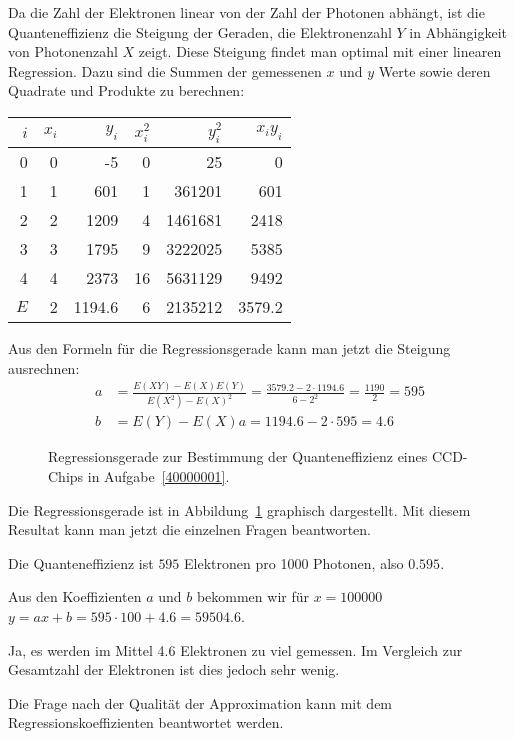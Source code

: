 \begin{loesung}
Da die Zahl der Elektronen linear von der Zahl der Photonen abhängt,
ist die Quanteneffizienz die Steigung der Geraden, die Elektronenzahl $Y$
in Abhängigkeit von Photonenzahl $X$ zeigt. Diese Steigung findet man
optimal mit einer linearen Regression. Dazu sind die Summen der gemessenen
$x$ und $y$ Werte sowie deren Quadrate und Produkte zu berechnen:
\begin{center}
\begin{tabular}{|r|rr|rr|r|}
\hline
$i$&$x_i$&$y_i$&$x_i^2$&$y_i^2$&$x_iy_i$\\
\hline
0&0&   -5&  0&     25&    0\\
1&1&  601&  1& 361201&  601\\
2&2& 1209&  4&1461681& 2418\\
3&3& 1795&  9&3222025& 5385\\
4&4& 2373& 16&5631129& 9492\\
\hline
$E$&2& 1194.6&6&2135212&3579.2\\
\hline
\end{tabular}
\end{center}
Aus den Formeln für die Regressionsgerade kann man jetzt die
Steigung ausrechnen:
\begin{align*}
a&=\frac{E(XY)-E(X)E(Y)}{E(X^2)-E(X)^2}=
\frac{3579.2-2 \cdot 1194.6}{6-2^2}=\frac{1190}{2}=595
\\
b&=E(Y)-E(X)a=1194.6-2 \cdot 595=4.6
\end{align*}
\begin{figure}
\centering
{}
\caption{Regressionsgerade zur Bestimmung der Quanteneffizienz eines CCD-Chips
in Aufgabe~\ref{40000001}.
\label{40000001:graphik}}
\end{figure}
Die Regressionsgerade ist in Abbildung~\ref{40000001:graphik} graphisch
dargestellt.
Mit diesem Resultat kann man jetzt die einzelnen Fragen beantworten.
\begin{teilaufgaben}
\item Die Quanteneffizienz ist $595$ Elektronen pro 1000 Photonen, also
$0.595$.
\item
Aus den Koeffizienten $a$ und $b$ bekommen wir für $x=100000$
$y=ax+b=595\cdot 100+4.6=59504.6$.
\item
Ja, es werden im Mittel 4.6 Elektronen zu viel gemessen. Im Vergleich
zur Gesamtzahl der Elektronen ist dies jedoch sehr wenig.
\item
Die Frage nach der Qualität der Approximation kann mit dem
Regressionskoeffizienten beantwortet werden.

\end{teilaufgaben}
\end{loesung}
